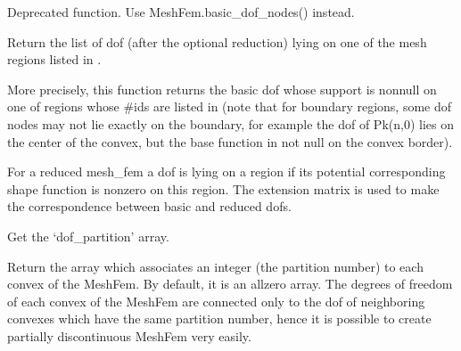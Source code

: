 \documentclass[a4paper,11pt,english]{sphinxmanual}
\begin{document}
\begin{fulllineitems}
\begin{fulllineitems}
\end{fulllineitems}


\begin{fulllineitems}
\label{\detokenize{python/cmdref_MeshFem:getfem.MeshFem.dof_nodes}}
Deprecated function. Use MeshFem.basic\_dof\_nodes() instead.

\end{fulllineitems}


\begin{fulllineitems}
\label{\detokenize{python/cmdref_MeshFem:getfem.MeshFem.dof_on_region}}
Return the list of dof (after the optional reduction) lying on one
of the mesh regions listed in .

More precisely, this function returns the basic dof whose support is
non\sphinxhyphen{}null on one of regions whose \#ids are listed in  (note
that for boundary regions, some dof nodes may not lie exactly
on the boundary, for example the dof of Pk(n,0) lies on the center
of the convex, but the base function in not null on the convex
border).

For a reduced mesh\_fem
a dof is lying on a region if its potential corresponding shape
function is nonzero on this region. The extension matrix is used
to make the correspondence between basic and reduced dofs.

\end{fulllineitems}


\begin{fulllineitems}
\label{\detokenize{python/cmdref_MeshFem:getfem.MeshFem.dof_partition}}
Get the ‘dof\_partition’ array.

Return the array which associates an integer (the partition number)
to each convex of the MeshFem. By default, it is an all\sphinxhyphen{}zero array.
The degrees of freedom of each convex of the MeshFem are connected
only to the dof of neighboring convexes which have the same
partition number, hence it is possible to create partially
discontinuous MeshFem very easily.


\end{fulllineitems}
\end{fulllineitems}
\end{document}
